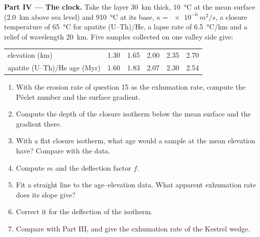 \begin{problem}
\medskip\noindent\textbf{Part IV --- The clock.}
Take the layer \qty{30}{km} thick, \qty{10}{\celsius} at the mean surface
(\qty{2.0}{km} above sea level) and \qty{910}{\celsius} at its base, $\kappa
= \qty{e-6}{m^2/s}$, a closure temperature of \qty{65}{\celsius} for apatite
(U--Th)/He, a lapse rate of \qty{6.5}{\celsius/km} and a relief of
wavelength \qty{20}{km}. Five samples collected on one valley side give:
\begin{center}
\small
\begin{tabular}{lccccc}
\hline
elevation (\unit{km}) & 1.30 & 1.65 & 2.00 & 2.35 & 2.70 \\
apatite (U--Th)/He age (\unit{Myr}) & 1.60 & 1.83 & 2.07 & 2.30 & 2.54 \\
\hline
\end{tabular}
\end{center}
\begin{enumerate}[resume]
  \item With the erosion rate of question 15 as the exhumation rate, compute
        the Péclet number and the surface gradient.
  \item Compute the depth of the closure isotherm below the mean surface and
        the gradient there.
  \item With a flat closure isotherm, what age would a sample at the mean
        elevation have? Compare with the data.
  \item Compute $m$ and the deflection factor $f$.
  \item Fit a straight line to the age--elevation data. What apparent
        exhumation rate does its slope give?
  \item Correct it for the deflection of the isotherm.
  \item Compare with Part III, and give the exhumation rate of the Kestrel
        wedge.
\end{enumerate}
\end{problem}
